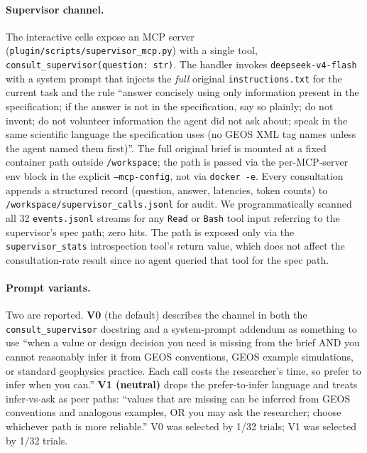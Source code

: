 \documentclass{article}
\begin{document}
\paragraph{Supervisor channel.} The interactive cells expose an MCP server (\texttt{plugin/scripts/supervisor\_mcp.py}) with a single tool, \texttt{consult\_supervisor(question: str)}. The handler invokes \texttt{deepseek-v4-flash} with a system prompt that injects the \emph{full} original \texttt{instructions.txt} for the current task and the rule ``answer concisely using only information present in the specification; if the answer is not in the specification, say so plainly; do not invent; do not volunteer information the agent did not ask about; speak in the same scientific language the specification uses (no GEOS XML tag names unless the agent named them first)''. The full original brief is mounted at a fixed container path outside \texttt{/workspace}; the path is passed via the per-MCP-server env block in the explicit \texttt{--mcp-config}, not via \texttt{docker -e}. Every consultation appends a structured record (question, answer, latencies, token counts) to \texttt{/workspace/supervisor\_calls.jsonl} for audit. We programmatically scanned all 32 \texttt{events.jsonl} streams for any \texttt{Read} or \texttt{Bash} tool input referring to the supervisor's spec path; zero hits. The path is exposed only via the \texttt{supervisor\_stats} introspection tool's return value, which does not affect the consultation-rate result since no agent queried that tool for the spec path.

\paragraph{Prompt variants.} Two are reported. \textbf{V0} (the default) describes the channel in both the \texttt{consult\_supervisor} docstring and a system-prompt addendum as something to use ``when a value or design decision you need is missing from the brief AND you cannot reasonably infer it from GEOS conventions, GEOS example simulations, or standard geophysics practice. Each call costs the researcher's time, so prefer to infer when you can.'' \textbf{V1 (neutral)} drops the prefer-to-infer language and treats infer-vs-ask as peer paths: ``values that are missing can be inferred from GEOS conventions and analogous examples, OR you may ask the researcher; choose whichever path is more reliable.'' V0 was selected by 1/32 trials; V1 was selected by 1/32 trials.
\end{document}
